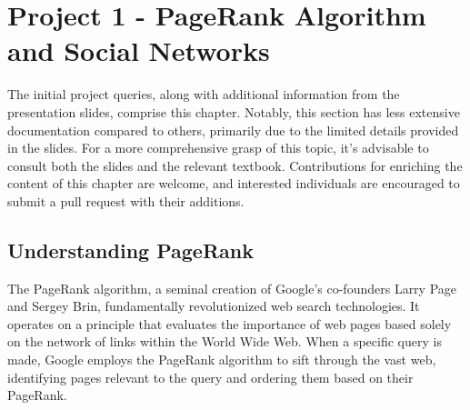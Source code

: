 \documentclass[unicode,11pt,a4paper,oneside,numbers=endperiod,openany]{scrartcl}
\begin{document}
\setassignment
{}

\newline


\section{Project 1 - PageRank Algorithm and Social Networks}
The initial project queries, along with additional information from the presentation slides, comprise this chapter. Notably, this section has less extensive documentation compared to others, primarily due to the limited details provided in the slides. For a more comprehensive grasp of this topic, it's advisable to consult both the slides and the relevant textbook. Contributions for enriching the content of this chapter are welcome, and interested individuals are encouraged to submit a pull request with their additions.

\subsection{Understanding PageRank}
The PageRank algorithm, a seminal creation of Google's co-founders Larry Page and Sergey Brin, fundamentally revolutionized web search technologies. It operates on a principle that evaluates the importance of web pages based solely on the network of links within the World Wide Web. When a specific query is made, Google employs the PageRank algorithm to sift through the vast web, identifying pages relevant to the query and ordering them based on their PageRank.
\end{document}
